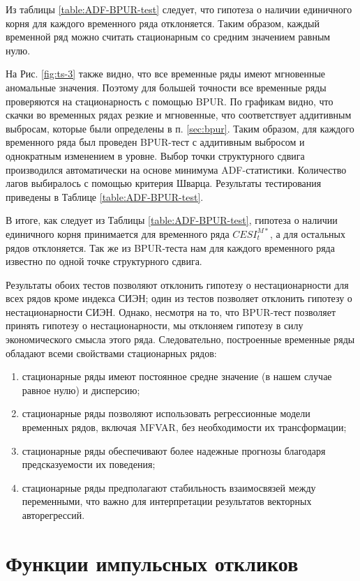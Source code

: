 \documentclass[a4paper, 14pt]{extreport}
\numberwithin{equation}{section}
\numberwithin{equation}{section}
\begin{document}
	Из таблицы \ref{table:ADF-BPUR-test} следует, что гипотеза о наличии единичного корня для каждого временного ряда отклоняется. Таким образом, каждый временной ряд можно считать стационарным со средним значением равным нулю.
	
	На Рис. \ref{fig:ts-3} также видно, что все временные ряды имеют мгновенные аномальные значения. Поэтому для большей точности все временные ряды проверяются на стационарность с помощью BPUR. По графикам видно, что скачки во временных рядах резкие и мгновенные, что соответствует аддитивным выбросам, которые были определены в п. \ref{sec:bpur}. Таким образом, для каждого временного ряда был проведен BPUR-тест с аддитивным выбросом и однократным изменением в уровне. Выбор точки структурного сдвига производился автоматически на основе минимума ADF-статистики. Количество лагов выбиралось с помощью критерия Шварца. Результаты тестирования приведены в Таблице \ref{table:ADF-BPUR-test}.
	
	В итоге, как следует из Таблицы \ref{table:ADF-BPUR-test}, гипотеза о наличии единичного корня принимается для временного ряда $CESI_t^{M*}$, а для остальных рядов отклоняется. Так же из BPUR-теста нам для каждого временного ряда известно по одной точке структурного сдвига.
	
	Результаты обоих тестов позволяют отклонить гипотезу о нестационарности для всех рядов кроме индекса СИЭН; один из тестов позволяет отклонить гипотезу о нестационарности СИЭН. Однако, несмотря на то, что BPUR-тест позволяет принять гипотезу о нестационарности, мы отклоняем гипотезу в силу экономического смысла этого ряда. Следовательно, построенные временные ряды обладают всеми свойствами стационарных рядов:
	\begin{enumerate}
		\item стационарные ряды имеют постоянное средне значение (в нашем случае равное нулю) и дисперсию;
		\item стационарные ряды позволяют использовать регрессионные модели временных рядов, включая MFVAR, без необходимости их трансформации;
		\item стационарные ряды обеспечивают более надежные прогнозы благодаря предсказуемости их поведения;
		\item стационарные ряды предполагают стабильность взаимосвязей между переменными, что важно для интерпретации результатов векторных авторегрессий.
	\end{enumerate}
	
	\section{Функции импульсных откликов}
	\label{sec:irf-practice}
	
\end{document}
